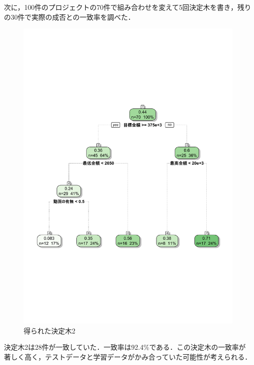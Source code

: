 次に，100件のプロジェクトの70件で組み合わせを変えて5回決定木を書き，残りの30件で実際の成否との一致率を調べた．


\begin{figure}[H]
\centering
\includegraphics[width=13cm]{figure24.pdf}
\caption{得られた決定木2}\label{sannp}
\end{figure}


決定木2は28件が一致していた．一致率は92.4\%である．この決定木の一致率が著しく高く，テストデータと学習データがかみ合っていた可能性が考えられる．

